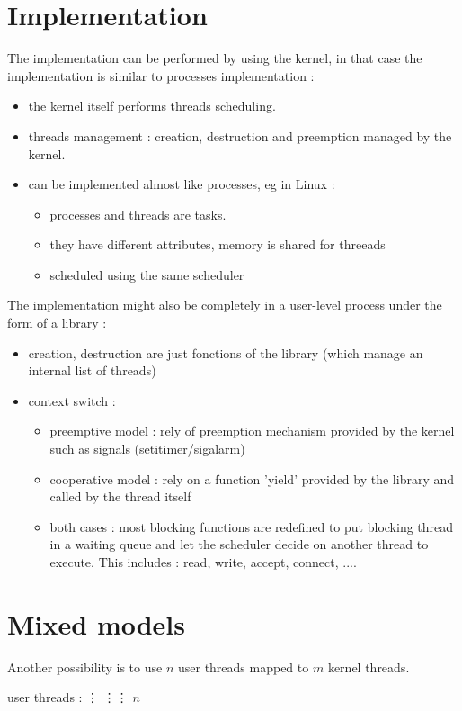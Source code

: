 \documentclass[a4paper,10pt]{article}
\begin{document}
\section{Implementation}

The implementation can be performed by using the kernel, in that case the implementation
is similar to processes implementation :

\begin{itemize}
\item the kernel itself performs threads scheduling.
\item threads management : creation, destruction and preemption managed by the kernel.
\item can be implemented almost like processes, eg in Linux :
\begin{itemize}
\item processes and threads are tasks.
\item they have different attributes, memory is shared for threeads
\item scheduled using the same scheduler
\end{itemize}
\end{itemize}

The implementation might also be completely in a user-level process under the form of a library :

\begin{itemize}
\item creation, destruction are just fonctions of the library (which manage an internal list of threads)
\item context switch :
\begin{itemize}
\item preemptive model : rely of preemption mechanism provided by  the kernel such as signals (setitimer/sigalarm)
\item cooperative model : rely on a function 'yield' provided by the library and called by the thread itself
\item both cases : most blocking functions are redefined to put blocking thread in a waiting queue and let the scheduler decide on another thread to execute. This includes : read, write, accept, connect, ....
\end{itemize}
\end{itemize}



\section{Mixed models}

Another possibility is to use $n$ user threads mapped to $m$ kernel threads.

user threads : \hspace{0.2cm} \vdots \hspace{0.2cm} \vdots \hspace{0.2cm}\vdots  \hspace{0.2cm}  $n$
 




 
\end{document}
